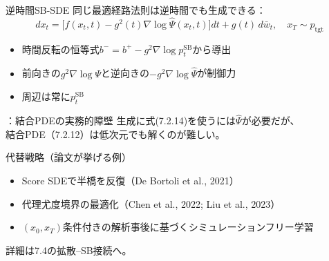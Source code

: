 \asmain
\begin{frame}{逆時間SB-SDE}
    同じ最適経路法則は逆時間でも生成できる：
    \[
        dx_{t}
        =
        \bigl[
        f(x_{t},t)
        -
        g^{2}(t)\nabla\log\widehat{\Psi}(x_{t},t)
        \bigr]dt
        +
        g(t)\,d\bar{w}_{t},
        \quad
        x_{T}\sim p_{\mathrm{tgt}}
        \tag{7.2.14}
    \]
    \begin{itemize}
        \item 時間反転の恒等式$b^{-}=b^{+}-g^{2}\nabla\log p_{t}^{\mathrm{SB}}$から導出
        \item 前向きの$g^{2}\nabla\log\Psi$と逆向きの$-g^{2}\nabla\log\widehat{\Psi}$が制御力
        \item 周辺は常に$p_{t}^{\mathrm{SB}}$
    \end{itemize}
\end{frame}
\assuppl
\begin{frame}{\supplmark：結合PDEの実務的障壁}
    生成に式(7.2.14)を使うには$\widehat{\Psi}$が必要だが、\\
    結合PDE（7.2.12）は低次元でも解くのが難しい。
    \begin{exampleblock}{代替戦略（論文が挙げる例）}
        \begin{itemize}
            \item Score SDEで半橋を反復（De Bortoli et al., 2021）
            \item 代理尤度境界の最適化（Chen et al., 2022; Liu et al., 2023）
            \item $(x_{0},x_{T})$条件付きの解析事後に基づくシミュレーションフリー学習
        \end{itemize}
        詳細は7.4の拡散--SB接続へ。
    \end{exampleblock}
\end{frame}
